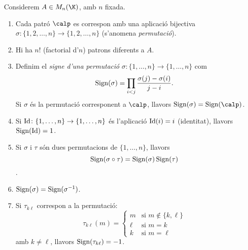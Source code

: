 \begin{lema}\label{lema:permutacions}
Considerem $A\in M_n(\K)$, amb $n$ fixada.
\begin{enumerate}[\rm (a)]
    \item Cada patró $\calp$ es correspon amb una aplicació bijectiva $\sigma\colon \{1,2,\dots,n\} \to \{1,2,\dots,n\}$ (s'anomena \emph{permutació}).
    \item Hi ha $n!$ (factorial d'$n$) patrons diferents a $A$.
    \item Definim el \emph{signe d'una permutació} $\sigma\colon \{1,\dots,n\}\to\{1,\dots,n\}$ com
    $$
    \operatorname{Sign}(\sigma)=\prod_{i<j} \frac{\sigma(j)-\sigma(i)}{j-i} .
    $$
    Si $\sigma$ és la permutació corresponent a $\calp$, llavors $\sign(\sigma)=\sign(\calp)$.
    \item Si $\operatorname{Id}\colon \{1,\dots,n\}\to\{1,\dots,n\}$ és l'aplicació $\operatorname{Id}(i)=i$ (identitat), llavors $\operatorname{Sign}(\operatorname{Id})=1$.
    \item Si $\sigma$ i $\tau$ són dues permutacions de $\{1,\dots, n\}$, llavors 
    $$\operatorname{Sign}(\sigma\circ\tau)=\operatorname{Sign}(\sigma)\operatorname{Sign}(\tau)$$.
    \item $\operatorname{Sign}(\sigma)=\operatorname{Sign}(\sigma^{-1})$.
    \item Si $\tau_{k\ell}$ correspon a la permutació:
    $$
    \tau_{k\ell}(m)=\left\{\begin{array}{ll} m & \text{si $m\not\in\{k,\ell\}$}\\ \ell & \text{si $m=k$} \\ k & \text{si $m=\ell$} \end{array} \right. 
    $$
    amb $k\neq \ell$, llavors $\operatorname{Sign}(\tau_{k\ell})=-1$.
\end{enumerate}
\end{lema}
